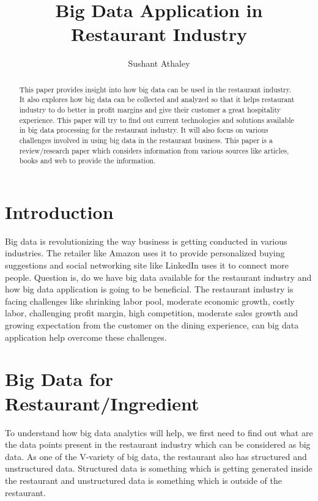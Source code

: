 \documentclass[sigconf]{acmart}
\begin{document}
\title{Big Data Application in Restaurant Industry}


\author{Sushant Athaley}



\begin{abstract}
This paper provides insight into how big data can be used in the restaurant industry. It also explores how big data can be collected and analyzed so that it helps restaurant industry to do better in profit margins and give their customer a great hospitality experience. This paper will try to find out current technologies and solutions available in big data processing for the restaurant industry. It will also focus on various challenges involved in using big data in the restaurant business. This paper is a review/research paper which considers information from various sources like articles, books and web to provide the information. 
\end{abstract}



\maketitle

\section{Introduction}
Big data is revolutionizing the way business is getting conducted in various industries. The retailer like Amazon uses it to provide personalized buying suggestions and social networking site like LinkedIn uses it to connect more people. Question is, do we have big data available for the restaurant industry and how big data application is going to be beneficial. The restaurant industry is facing challenges like shrinking labor pool, moderate economic growth, costly labor, challenging profit margin, high competition, moderate sales growth and growing expectation from the customer on the dining experience, can big data application help overcome these challenges.\cite{www-restaurant-challenges}


\section{Big Data for Restaurant/Ingredient}
To understand how big data analytics will help, we first need to find out what are the data points present in the restaurant industry which can be considered as big data. As one of the V-variety of big data, the restaurant also has structured and unstructured data. Structured data is something which is getting generated inside the restaurant and unstructured data is something which is outside of the restaurant.
\end{document}
